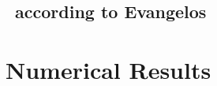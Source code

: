 \documentclass[hyperref]{inputs/gatech-thesis}
\begin{document}
\appendix

\section{\KSe\ according to Evangelos}


\chapter{Numerical Results}

         \PublicPrivate{
         }{ %
 
         } %
\begin{postliminary}
{}
\begin{vita}
    
\end{vita}
\end{postliminary}
\end{document}
